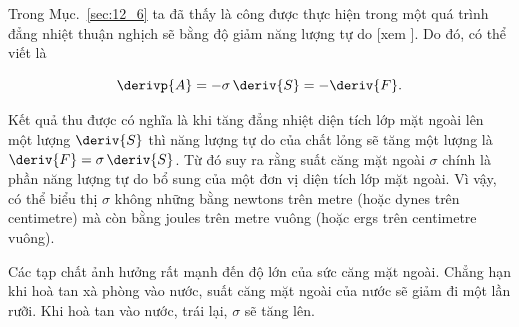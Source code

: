 
Trong Mục.~\ref{sec:12_6} ta đã thấy là công được thực hiện trong một quá trình đẳng nhiệt thuận nghịch sẽ bằng độ giảm năng lượng tự do [xem ]. Do đó, có thể viết là

\begin{equation*}
	\derivp{A} = -\sigma\,\deriv{S} = -\deriv{F}.
\end{equation*}

\noindent


Kết quả thu được có nghĩa là khi tăng đẳng nhiệt diện tích lớp mặt ngoài lên một lượng $\deriv{S}$ thì năng lượng tự do của chất lỏng sẽ tăng một lượng là $\deriv{F}=\sigma\,\deriv{S}$. Từ đó suy ra rằng suất căng mặt ngoài $\sigma$ chính là phần năng lượng tự do bổ sung của một đơn vị diện tích lớp mặt ngoài. Vì vậy, có thể biểu thị $\sigma$ không những bằng newtons trên metre (hoặc dynes trên centimetre) mà còn bằng joules trên metre vuông (hoặc ergs trên centimetre vuông).


Các tạp chất ảnh hưởng rất mạnh đến độ lớn của sức căng mặt ngoài. Chẳng hạn khi hoà tan xà phòng vào nước, suất căng mặt ngoài của nước sẽ giảm đi một lần rưỡi. Khi hoà tan  vào nước, trái lại, $\sigma$ sẽ tăng lên.


